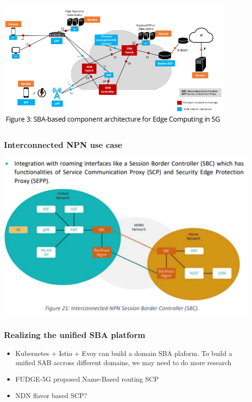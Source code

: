 \documentclass{beamer}
\begin{document}
\begin{frame}
  \frametitle{}
  \center
  \includegraphics[width=0.9\textwidth]{images/fudge-esba}
\end{frame}
\begin{frame}
  \frametitle{Interconnected NPN use case}
  \center
    \includegraphics[width=\textwidth]{images/scp-roaming}
\end{frame}

\begin{frame}
  \frametitle{Realizing the unified SBA platform}
  \begin{itemize}
    \item {Kubernetes + Istio + Evoy can build a domain SBA plaform. To build a unified SAB accross different domains, we may need to do more research}
    \item {FUDGE-5G proposed Name-Based routing SCP}
    \item {NDN flavor based SCP?}    
  \end{itemize}
\end{frame}

\end{document}
